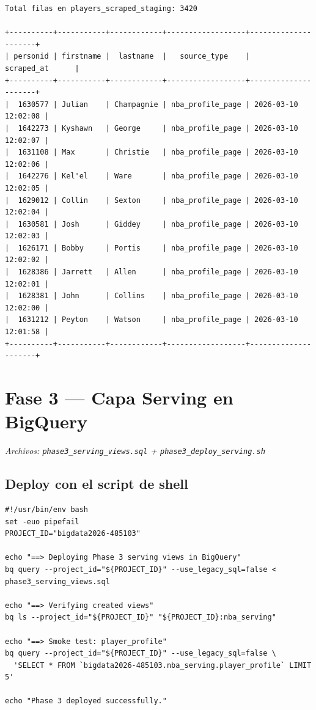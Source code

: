\documentclass[12pt, letterpaper]{article}
\begin{document}
\begin{lstlisting}[style=outputstyle, caption={Evidencia --- staging table con 3,420 filas y ultimos 10 jugadores enriquecidos}]
Total filas en players_scraped_staging: 3420

+----------+-----------+------------+------------------+---------------------+
| personid | firstname |  lastname  |   source_type    |     scraped_at      |
+----------+-----------+------------+------------------+---------------------+
|  1630577 | Julian    | Champagnie | nba_profile_page | 2026-03-10 12:02:08 |
|  1642273 | Kyshawn   | George     | nba_profile_page | 2026-03-10 12:02:07 |
|  1631108 | Max       | Christie   | nba_profile_page | 2026-03-10 12:02:06 |
|  1642276 | Kel'el    | Ware       | nba_profile_page | 2026-03-10 12:02:05 |
|  1629012 | Collin    | Sexton     | nba_profile_page | 2026-03-10 12:02:04 |
|  1630581 | Josh      | Giddey     | nba_profile_page | 2026-03-10 12:02:03 |
|  1626171 | Bobby     | Portis     | nba_profile_page | 2026-03-10 12:02:02 |
|  1628386 | Jarrett   | Allen      | nba_profile_page | 2026-03-10 12:02:01 |
|  1628381 | John      | Collins    | nba_profile_page | 2026-03-10 12:02:00 |
|  1631212 | Peyton    | Watson     | nba_profile_page | 2026-03-10 12:01:58 |
+----------+-----------+------------+------------------+---------------------+
\end{lstlisting}

\section{Fase 3 — Capa Serving en BigQuery}
\textit{Archivos: \texttt{phase3\_serving\_views.sql} + \texttt{phase3\_deploy\_serving.sh}}

\subsection{Deploy con el script de shell}

\begin{lstlisting}[style=codestyle, caption={Script de despliegue \texttt{phase3\_deploy\_serving.sh}}]
#!/usr/bin/env bash
set -euo pipefail
PROJECT_ID="bigdata2026-485103"

echo "==> Deploying Phase 3 serving views in BigQuery"
bq query --project_id="${PROJECT_ID}" --use_legacy_sql=false < phase3_serving_views.sql

echo "==> Verifying created views"
bq ls --project_id="${PROJECT_ID}" "${PROJECT_ID}:nba_serving"

echo "==> Smoke test: player_profile"
bq query --project_id="${PROJECT_ID}" --use_legacy_sql=false \
  'SELECT * FROM `bigdata2026-485103.nba_serving.player_profile` LIMIT 5'

echo "Phase 3 deployed successfully."
\end{lstlisting}
\end{document}
